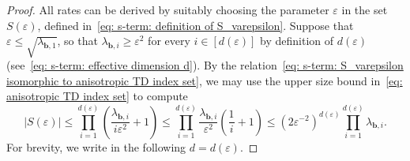 \documentclass[namedate,webpdf]{ima-authoring-template-blank}
\newcommand{\abs}[1]{\left|#1\right|}
\numberwithin{counter}{section}
\numberwithin{equation}{section}
\theoremstyle{plain}
\theoremstyle{definition}
\theoremstyle{thmstyletwo}
\begin{document}
\begin{proof}
    All rates can be derived by suitably choosing the parameter \(\varepsilon\) in the set \(S(\varepsilon)\), defined in~\eqref{eq: s-term: definition of S_varepsilon}.
    Suppose that \( \varepsilon \leq \sqrt{\lambda_{\bm{b}, 1}} \), so that \(\lambda_{\bm{b}, i} \geq \varepsilon^2\) for every \(i \in [d(\varepsilon)]\) by definition of \(d(\varepsilon)\) (see~\eqref{eq: s-term: effective dimension d}). By the relation~\eqref{eq: s-term: S_varepsilon isomorphic to anisotropic TD index set}, we may use the upper size bound in~\eqref{eq: anisotropic TD index set} to compute
    \begin{equation}
    \label{eq: upper size bound for S_varepsilon}
        \abs{S(\varepsilon)} \leq \prod_{i=1}^{d(\varepsilon)} \left(\frac{\lambda_{\bm{b},i}}{i \varepsilon^2} + 1\right) 
        \leq \prod_{i=1}^{d(\varepsilon)} \frac{\lambda_{\bm{b},i}}{\varepsilon^2} \left(\frac{1}{i} + 1\right) 
        \leq (2 \varepsilon^{-2})^{d(\varepsilon)} \prod_{i=1}^{d(\varepsilon)} \lambda_{\bm{b},i}.
    \end{equation}
    For brevity, we write in the following \(d = d(\varepsilon)\).



\end{proof}
\end{document}
